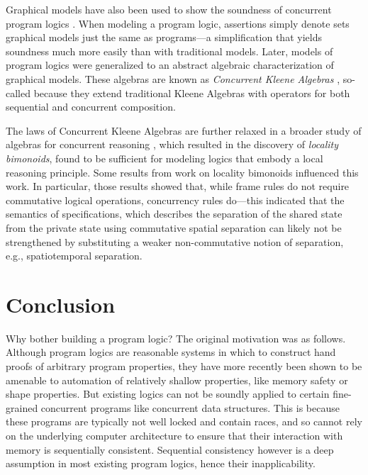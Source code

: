 \documentclass[11pt]{report}         %
\begin{document}
Graphical models have also been used to show the soundness of concurrent program logics \cite{DBLP:journals/ipl/WehrmanHO09}. When modeling a program logic, assertions simply denote sets graphical models just the same as programs---a simplification that yields soundness much more easily than with traditional models. Later, models of program logics were generalized to an abstract algebraic characterization of graphical models. These algebras are known as \emph{Concurrent Kleene Algebras} \cite{DBLP:conf/RelMiCS/HoareMSW09,DBLP:conf/concur/HoareMSW09}, so-called because they extend traditional Kleene Algebras with operators for both sequential and concurrent composition. 

The laws of Concurrent Kleene Algebras are further relaxed in a broader study of algebras for concurrent reasoning \cite{DBLP:conf/concur/HoareHMOPS11}, which resulted in the discovery of \emph{locality bimonoids}, found to be sufficient for modeling logics that embody a local reasoning principle. Some results from work on locality bimonoids influenced this work. In particular, those results showed that, while frame rules do not require commutative logical operations, concurrency rules do---this indicated that the semantics of specifications, which describes the separation of the shared state from the private state using commutative spatial separation can likely not be strengthened by substituting a weaker non-commutative notion of separation, e.g., spatiotemporal separation. 




\chapter{Conclusion}
\label{ch:conclusion}

Why bother building a program logic? The original motivation was as follows. Although program logics are reasonable systems in which to construct hand proofs of arbitrary program properties, they have more recently been shown to be amenable to automation of relatively shallow properties, like memory safety or shape properties. But existing logics can not be soundly applied to certain fine-grained concurrent programs like concurrent data structures. This is because these programs are typically not well locked and contain races, and so cannot rely on the underlying computer architecture to ensure that their interaction with memory is sequentially consistent. Sequential consistency however is a deep assumption in most existing program logics, hence their inapplicability.
\end{document}

